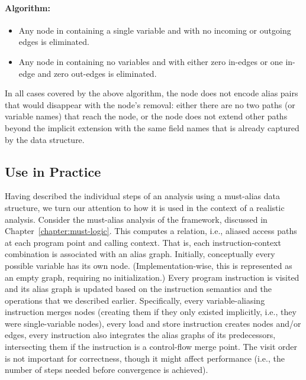 \paragraph{Algorithm: }
\begin{itemize}
\item Any node in  containing a single variable and with no incoming or outgoing edges is eliminated.

\item Any node in  containing no variables and with either zero in-edges or one in-edge and zero out-edges is eliminated.
\end{itemize}

In all cases covered by the above algorithm, the node does not encode alias pairs that would disappear with the node's removal: either there are no two paths (or variable names) that reach the node, or the node does not extend other paths beyond the implicit extension with the same field names that is already captured by the data structure.


\subsection{Use in Practice}

Having described the individual steps of an analysis using a must-alias data structure, we turn our attention to how it is used in the context of a realistic analysis. Consider the must-alias analysis of the \doop{} framework, discussed in Chapter~\ref{chapter:must-logic}. This computes a  relation, i.e., aliased access paths at each program point and calling context. That is, each instruction-context combination is associated with an alias graph. Initially, conceptually every possible variable has its own node. (Implementation-wise, this is represented as an empty graph, requiring no initialization.) Every program instruction is visited and its alias graph is updated based on the instruction semantics and the operations that we described earlier. Specifically, every variable-aliasing instruction merges nodes (creating them if they only existed implicitly, i.e., they were single-variable nodes), every load and store instruction creates nodes and/or edges, every instruction also integrates the alias graphs of its predecessors, intersecting them if the instruction is a control-flow merge point. The visit order is not important for correctness, though it might affect performance (i.e., the number of steps needed before convergence is achieved).

